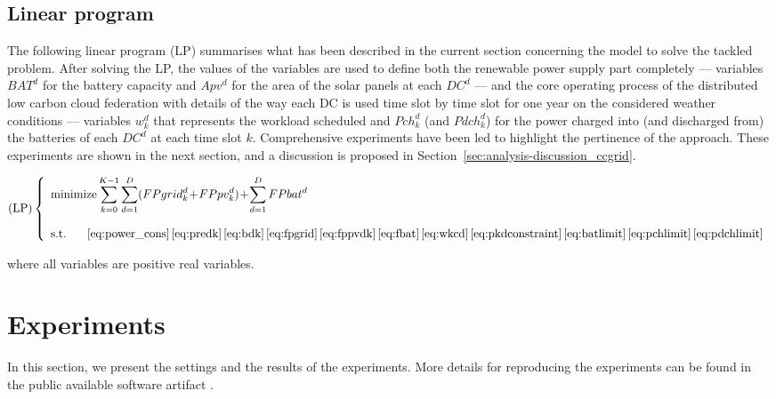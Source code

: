\subsection{Linear program}

The following linear program (LP) summarises what has been described in the current section concerning the model to solve the tackled problem. After solving the LP, the values of the variables are used to define both the renewable power supply part completely --- variables $BAT^d$ for the battery capacity and $Apv^d$ for the area of the solar panels at each $DC^d$  --- and the core operating process of the distributed low carbon cloud federation with details of the way each DC is used time slot by time slot for one year on the considered weather conditions --- variables $ w_k^d$ that represents the workload scheduled and $Pch^d_k$ (and $Pdch^d_k$) for the power charged into (and discharged from) the batteries of each $DC^d$ at each time slot $k$. Comprehensive experiments have been led to highlight the pertinence of the approach. These experiments are shown in the next section, and a discussion is proposed in Section~\ref{sec:analysis-discussion_ccgrid}.

\begin{equation}\nonumber
    \text{(LP)}\left\{
    \begin{array}{ll}
        \text{minimize}\displaystyle\sum_{k=0}^{K-1}\sum_{d=1}^D (FPgrid^d_k\!+\!FPpv^d_k)\!+\!\sum_{d=1}^D FPbat^d \label{eq:lp}\\ \\
        \text{s.t. } \ \ \ \ 
\eqref{eq:power_cons}\,\eqref{eq:predk}\,\eqref{eq:bdk}\,\eqref{eq:fpgrid}\,\eqref{eq:fppvdk}\,\eqref{eq:fbat}\,\eqref{eq:wkcd}\,\eqref{eq:pkdconstraint}\,\eqref{eq:batlimit}\,\eqref{eq:pchlimit}\,\eqref{eq:pdchlimit} %
    \end{array}
    \right.
\end{equation}

where all variables are positive real variables. 


\section{Experiments}
\label{sec:experiments_ccgrid}

In this section, we present the settings and the results of the
experiments.  More details for reproducing the experiments can be
found in the public available software artifact \cite{artifact_ccgrid}. 


